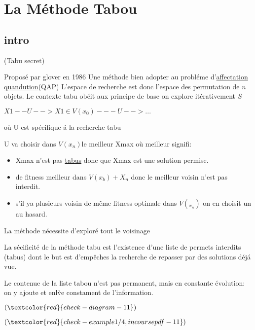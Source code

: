 \chapter{La M\'ethode Tabou}

\section{intro}
(Tabu secret)

Propos\'e par glover en 1986 
Une m\'ethode bien adopter au probl\'eme d'\underline{affectation quandution}(QAP)
L'espace de recherche est donc l'espace des permutation de  $n$ objets.
Le contexte tabu ob\'eit aux  principe de base on explore it\'erativement $S$
\begin{center}
$X1 --U--> X1 \in V(x_0) ---U-->...$
\end{center}
o\`u U est sp\'ecifique \'a la recherche  tabu

U va choisir dans $V(x_{n})$le meilleur Xmax
o\`u meilleur signifi:
\begin{itemize}
\item Xmax n'est pas \underline{tabus} donc que Xmax est une solution permise.
\item de fitness meilleur dans $V(x_b)+{X_n}$ donc le meilleur voisin n'est pas interdit.
\item s'il ya plusieurs voisin de m\^eme fitness optimale dans $V(_{x_n})$ on en choisit un au hasard.
\end{itemize}
La m\'ethode n\'ecessite d'explor\'e tout le voisinage

La s\'ecificit\'e de la m\'ethode tabu est l'existence d'une liste de permets interdits (tabus) dont le but est d'emp\^eches la recherche de repasser par des solutions d\'ej\'a vue.

Le contenue de la liste tabou n'est pas permanent, mais en constante \'evolution: on y ajoute et enl\`ve constament de l'information.


$(\textcolor{red}{check- diagram - 11})$ 


$(\textcolor{red}{check- example 1/4 , in course pdf - 11})$ 

